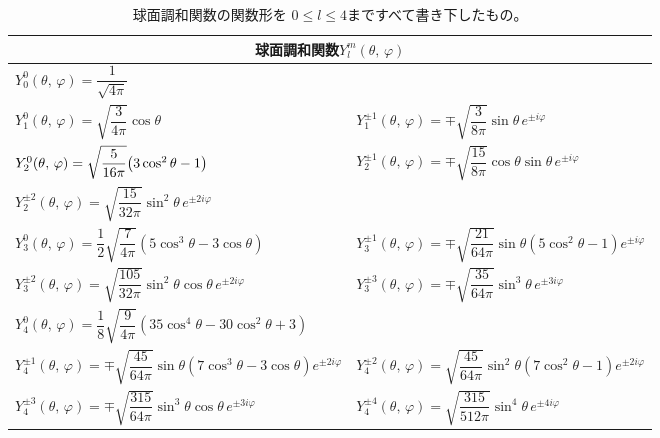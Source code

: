 \documentclass[../master.tex]{subfiles}
\begin{document}
\begin{table}[h]
	\centering
	\caption{球面調和関数の関数形を
		\(0\leq l \leq 4\)まですべて書き下したもの。}
	\begin{tabular}[t]{ll}
		\hline
		\multicolumn{2}{c}{球面調和関数\(Y_l^m(\theta,\,\varphi)\)}                                                                 \\
		\hline \hline
		\(Y_0^{0}(\theta,\,\varphi)=\dfrac{1}{\sqrt{4\pi}}\) &
		\rule[-5mm]{0mm}{12mm}                                                                                                \\
		\(Y_1^{0}(\theta,\,\varphi) =\sqrt{\dfrac{3}{4\pi}}\cos\theta\)                                &
		\(Y_1^{\pm 1}(\theta,\,\varphi) =\mp\sqrt{\dfrac{3}{8\pi}}\sin\theta \,e^{\pm i\varphi}\)
		\rule[-5mm]{0mm}{10mm}                                                                                                \\
		\(Y_2^{0}(\theta,\,\varphi) =\sqrt{\dfrac{5}{16\pi}}\qty(3\cos^2\theta-1)\)                    &
		\(Y_2^{\pm 1}(\theta,\,\varphi) =\mp\sqrt{\dfrac{15}{8\pi}}\cos\theta\sin\theta \,e^{\pm i\varphi}\)
		\rule[-5mm]{0mm}{10mm}                                                                                                \\
		\(Y_2^{\pm 2}(\theta,\,\varphi) =\sqrt{\dfrac{15}{32\pi}}\sin^2\theta \,e^{\pm 2 i\varphi}\)&
		\rule[-5mm]{0mm}{10mm}                                                                                                \\
		\(Y_3^0(\theta,\,\varphi) =\dfrac{1}{2}\sqrt{\dfrac{7}{4\pi}}(5\cos^3\theta-3\cos\theta)\) &
		\(Y_3^{\pm 1}(\theta,\,\varphi) =\mp\sqrt{\dfrac{21}{64\pi}}\sin\theta(5\cos^2\theta-1) e^{\pm i\varphi}\)
		\rule[-5mm]{0mm}{10mm}\\
		\(Y_3^{\pm 2}(\theta,\,\varphi) =\sqrt{\dfrac{105}{32\pi}}\sin^2\theta\cos\theta \,e^{\pm 2i\varphi}\) &
		\(Y_3^{\pm 3}(\theta,\,\varphi) =\mp\sqrt{\dfrac{35}{64\pi}}\sin^3\theta \,e^{\pm 3i\varphi}\)
		\rule[-5mm]{0mm}{10mm}\\
		\(Y_4^0(\theta,\,\varphi) =\dfrac{1}{8}\sqrt{\dfrac{9}{4\pi}}(35\cos^4\theta-30\cos^2\theta+3)\) &
		\rule[-5mm]{0mm}{10mm}\\
		\(Y_4^{\pm 1}(\theta,\,\varphi) =\mp\sqrt{\dfrac{45}{64\pi}}\sin\theta(7\cos^3\theta-3\cos\theta) e^{\pm 2i\varphi}\)&
		\(Y_4^{\pm 2}(\theta,\,\varphi) =\sqrt{\dfrac{45}{64\pi}}\sin^2\theta(7\cos^2\theta-1) e^{\pm 2i\varphi}\)
		\rule[-5mm]{0mm}{10mm}\\
		\(Y_4^{\pm 3}(\theta,\,\varphi) =\mp\sqrt{\dfrac{315}{64\pi}}\sin^3\theta\cos\theta \,e^{\pm 3i\varphi}\) &
		\(Y_4^{\pm 4}(\theta,\,\varphi) =\sqrt{\dfrac{315}{512\pi}}\sin^4\theta \,e^{\pm 4i\varphi}\)
		\rule[-5mm]{0mm}{10mm}\\
		\hline
	\end{tabular}
	\renewcommand{\arraystretch}{1.0}
\end{table}
\end{document}
